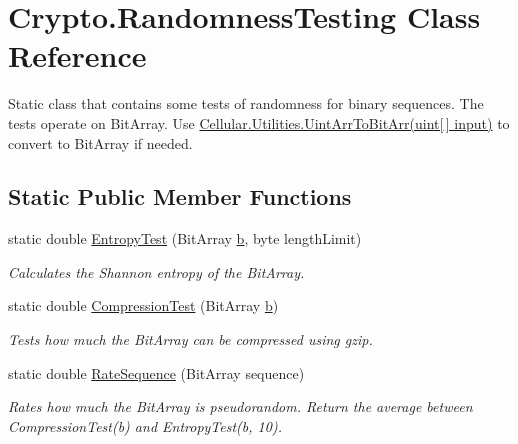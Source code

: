\hypertarget{class_crypto_1_1_randomness_testing}{}\section{Crypto.\+Randomness\+Testing Class Reference}
\label{class_crypto_1_1_randomness_testing}


Static class that contains some tests of randomness for binary sequences. The tests operate on Bit\+Array. Use {\ttfamily \hyperlink{class_cellular_1_1_utilities_a3e6d6ebde1b445f03d3c0b1a9c0274e6}{Cellular.\+Utilities.\+Uint\+Arr\+To\+Bit\+Arr(uint\mbox{[}$\,$\mbox{]} input)}} to convert to Bit\+Array if needed.  


\subsection*{Static Public Member Functions}
\begin{DoxyCompactItemize}
\item 
static double \hyperlink{class_crypto_1_1_randomness_testing_a86ef256c8a7c87df3fdbbf5673465cb0}{Entropy\+Test} (Bit\+Array \hyperlink{jquery_8js_a2fa551895933fae935a0a6b87282241d}{b}, byte length\+Limit)
\begin{DoxyCompactList}\small\item\em Calculates the Shannon entropy of the Bit\+Array. \end{DoxyCompactList}\item 
static double \hyperlink{class_crypto_1_1_randomness_testing_af903b13649b40d4895243f51c62341cc}{Compression\+Test} (Bit\+Array \hyperlink{jquery_8js_a2fa551895933fae935a0a6b87282241d}{b})
\begin{DoxyCompactList}\small\item\em Tests how much the Bit\+Array can be compressed using gzip. \end{DoxyCompactList}\item 
static double \hyperlink{class_crypto_1_1_randomness_testing_a34e225189cd735e8cfa82f6ab3b7d97f}{Rate\+Sequence} (Bit\+Array sequence)
\begin{DoxyCompactList}\small\item\em Rates how much the Bit\+Array is pseudorandom. Return the average between {\ttfamily Compression\+Test(b)} and {\ttfamily Entropy\+Test(b, 10).} \end{DoxyCompactList}\end{DoxyCompactItemize}


